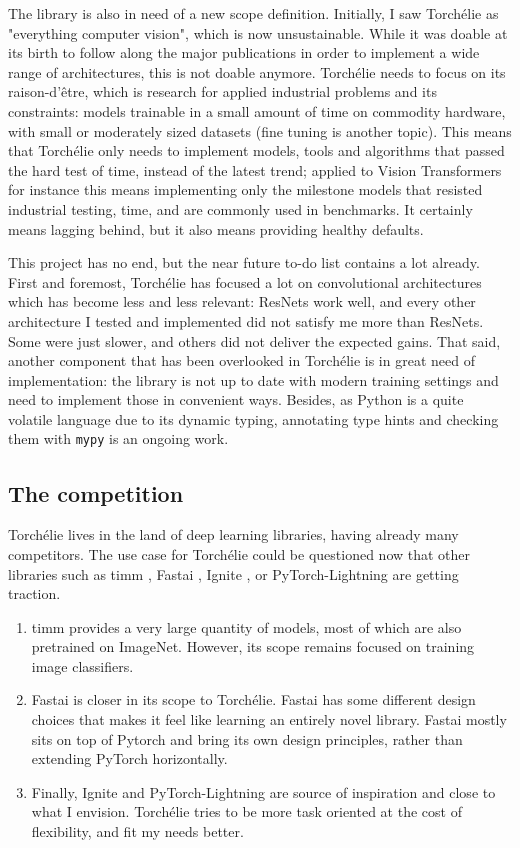 The library is also in need of a new scope definition. Initially, I saw Torchélie as "everything computer vision", which is now unsustainable. While it was doable at its birth to follow along the major publications in order to implement a wide range of architectures, this is not doable anymore. Torchélie needs to focus on its raison-d'être, which is research for applied industrial problems and its constraints: models trainable in a small amount of time on commodity hardware, with small or moderately sized datasets (fine tuning is another topic). This means that Torchélie only needs to implement models, tools and algorithms that passed the hard test of time, instead of the latest trend; applied to Vision Transformers \cite{vit} for instance this means implementing only the milestone models that resisted industrial testing, time, and are commonly used in benchmarks. It certainly means lagging behind, but it also means providing healthy defaults.

This project has no end, but the near future to-do list contains a lot already. First and foremost, Torchélie has focused a lot on convolutional architectures which has become less and less relevant: ResNets work well, and every other architecture I tested and implemented did not satisfy me more than ResNets. Some were just slower, and others did not deliver the expected gains. That said, another component that has been overlooked in Torchélie is in great need of implementation: the library is not up to date with modern training settings and need to implement those in convenient ways. Besides, as Python is a quite volatile language due to its dynamic typing, annotating type hints and checking them with \texttt{mypy} \cite{mypy} is an ongoing work.

\subsection{The competition}

Torchélie lives in the land of deep learning libraries, having already many competitors. The use case for Torchélie could be questioned now that other libraries such as timm \cite{timm}, Fastai \cite{fastai}, Ignite \cite{ignite}, or PyTorch-Lightning are getting traction.

\begin{enumerate}
    \item timm provides a very large quantity of models, most of which are also pretrained on ImageNet. However, its scope remains focused on training image classifiers.
    \item Fastai is closer in its scope to Torchélie. Fastai has some different design choices that makes it feel like learning an entirely novel library. Fastai mostly sits on top of Pytorch and bring its own design principles, rather than extending PyTorch horizontally.
    \item Finally, Ignite and PyTorch-Lightning are source of inspiration and close to what I envision. Torchélie tries to be more task oriented at the cost of flexibility, and fit my needs better.
\end{enumerate}

